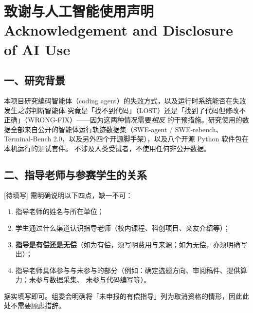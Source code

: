 %

\newpage
\section*{致谢与人工智能使用声明\\\large Acknowledgement and Disclosure of AI Use}

\subsection*{一、研究背景}

本项目研究编码智能体（coding agent）的失败方式，以及运行时系统能否在失败发生\emph{之前}判断智能体
究竟是「找不到代码」（LOST）还是「找到了代码但修改不正确」（WRONG-FIX）——因为这两种情况需要\emph{相反}
的干预措施。研究使用的数据全部来自公开的智能体运行轨迹数据集（SWE-agent / SWE-rebench、
Terminal-Bench 2.0，以及另外四个开源脚手架），以及八个开源 Python 软件包在本机运行的测试套件。
不涉及人类受试者，不使用任何非公开数据。

\subsection*{二、指导老师与参赛学生的关系}

[待填写] 需明确说明以下四点，缺一不可：
\begin{enumerate}[leftmargin=1.6em,itemsep=1pt]
  \item 指导老师的姓名与所在单位；
  \item 学生通过什么渠道认识指导老师（校内课程、科创项目、亲友介绍等）；
  \item \textbf{指导是有偿还是无偿}（如为有偿，须写明费用与来源；如为无偿，亦须明确写出）；
  \item 指导老师具体参与与未参与的部分（例如：确定选题方向、审阅稿件、提供算力；未参与数据采集、
        未参与代码编写等）。
\end{enumerate}
据实填写即可。组委会明确将「未申报的有偿指导」列为取消资格的情形，因此此处不需要顾虑措辞。

